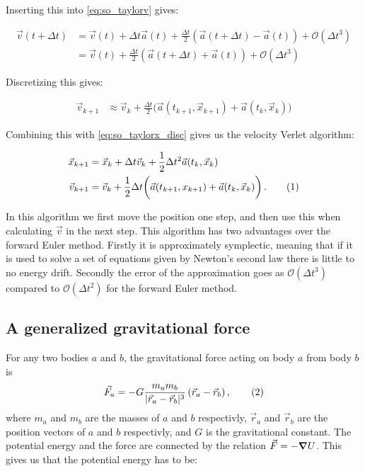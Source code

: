 \documentclass[reprint,english,notitlepage]{revtex4-1}  %
\newcommand\numberthis{\addtocounter{equation}{1}\tag{\theequation}}
\begin{document}
Inserting this into \eqref{eq:so_taylorv} gives:

\begin{align*}
\vec{v}(t+\Delta t) &= \vec{v}(t) + \Delta t \vec{a}(t) + \frac{\Delta t}{2} (\vec{a}(t+ \Delta t ) - \vec{a}(t)) + \mathcal{O}(\Delta t^3) \\
&= \vec{v}(t) + \frac{\Delta t}{2} (\vec{a}(t+ \Delta t ) + \vec{a}(t)) +  \mathcal{O}(\Delta t^3) 
\end{align*}

Discretizing this gives:

\begin{align*}
\vec{v}_{k+1} &\approx \vec{v}_k + \frac{\Delta t}{2} \bigg( \vec{a}(t_{k+1}, \vec{x}_{k+1}) + \vec{a}(t_k, \vec{x}_k) \bigg)
\end{align*}

Combining this with \eqref{eq:so_taylorx_disc} gives us the velocity Verlet algorithm:

\begin{align*}
\vec{x}_{k+1} &= \vec{x}_k + \Delta t \vec{v}_k + \frac{1}{2} \Delta t^2 \vec{a}(t_k,\vec{x}_k) \\
\vec{v}_{k+1} &= \vec{v}_k + \frac{1}{2}\Delta t \bigg( \vec{a}(t_{k+1},x_{k+1}) + \vec{a}(t_k, \vec{x}_k) \bigg) \, . \numberthis \label{eq:VelocityVerlet}
\end{align*}

In this algorithm we first move the position one step, and then use this when calculating $\vec{v}$ in the next step. This algorithm has two advantages over the forward Euler method. Firstly it is approximately symplectic, meaning that if it is used to solve a set of equations given by Newton's second law there is little to no energy drift. Secondly the error of the approximation goes as $\mathcal{O}(\Delta t^3)$ compared to $\mathcal{O}(\Delta t^2)$ for the forward Euler method.

\subsection{A generalized gravitational force} \label{sec:II:b}
For any two bodies \(a\) and \(b\), the gravitational force acting on body \(a\) from body \(b\) is
\begin{align*}
	\vec{F}_{a} = -G\frac{m_{a}m_{b}}{|\vec{r}_{a}-\vec{r}_{b}|^{3}}\left(\vec{r}_{a}-\vec{r}_{b}\right), \numberthis \label{eq:grav} \\
\end{align*}
where \(m_{a}\) and \(m_{b}\) are the masses of \(a\) and \(b\) respectivly, \(\vec{r}_{a}\) and \(\vec{r}_{b}\) are the position vectors of \(a\) and \(b\) respectivly, and \(G\) is the gravitational constant. The potential energy and the force are connected by the relation $\vec{F} = - \gradient U$. This gives us that the potential energy has to be:
\end{document}

